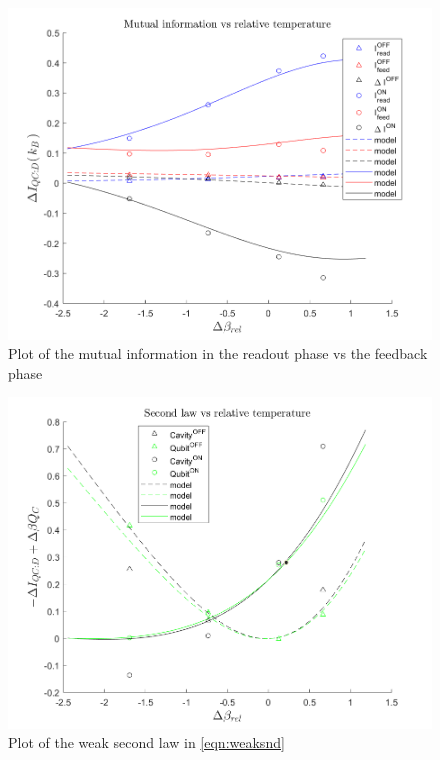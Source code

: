 \documentclass[10pt,a4paper]{report}
\theoremstyle{plain}
\theoremstyle{definition}
\theoremstyle{remark}
\begin{document}
\begin{figure}
  \centering
  \includegraphics[height=0.45\textheight]{plots/Info1.png}
  \caption{Plot of the mutual information in the readout phase vs the feedback
    phase}\label{fig:info1}

\end{figure}

\begin{figure}
  \centering
  \includegraphics[height=0.45\textheight]{plots/Weak1.png}
  \caption{Plot of the weak second law in \cref{eqn:weaksnd}}\label{fig:weak1}
\end{figure}
\end{document}

